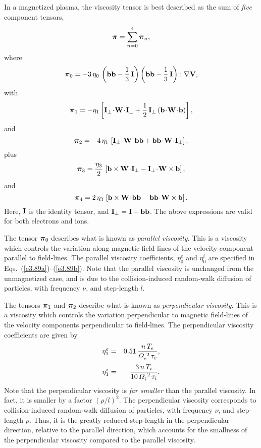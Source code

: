 In a magnetized plasma, the viscosity tensor is best described as the
sum of {\em five}\/ component tensors,
\begin{equation}
\mbox{\boldmath$\pi$}  = \sum_{n=0}^4 \mbox{\boldmath$\pi$}_n,
\end{equation}
where 
\begin{equation}
\mbox{\boldmath$\pi$}_0 = - 3\,\eta_0\,\left({\bf b}{\bf b} - \frac{1}{3}\,{\bf I}\right)
\left({\bf b}{\bf b} - \frac{1}{3}\,{\bf I}\right): \nabla {\bf V},
\end{equation}
with
\begin{equation}
\bpi_1 =- \eta_1\left[{\bf I}_\perp\! \cdot\!{\bf W}\!\cdot\!{\bf I}_\perp
+ \frac{1}{2}\,{\bf I}_\perp\,({\bf b}\!\cdot\!{\bf W}\!\cdot\!{\bf b})\right],
\end{equation}
and
\begin{equation}
\bpi_2 = -4\,\eta_1\,\left[ {\bf I}_\perp\!\cdot\!
{\bf W}\!\cdot\!{\bf b}{\bf b}
+ {\bf b}{\bf b}\!\cdot\!{\bf W} \!\cdot\!{\bf I}_\perp\right].
\end{equation}
plus
\begin{equation}
\mbox{\boldmath$\pi$}_3 = \frac{\eta_3}{2}\,\left[ {\bf b}\times 
{\bf W}\!\cdot\!{\bf I}_\perp - {\bf I}_\perp\!\cdot\!{\bf W}\times{\bf b}
\right],
\end{equation}
and
\begin{equation}
\mbox{\boldmath$\pi$}_4 = 2\,\eta_3\,\left[{\bf b} \times{\bf W} \!\cdot\! {\bf b}{\bf b}
- {\bf b}{\bf b} \!\cdot\!{\bf W} \times{\bf b}\right].
\end{equation}
Here, ${\bf I}$ is the identity tensor, and 
${\bf I}_\perp = {\bf I} - {\bf b}{\bf b}$. The above
expressions are valid for both electrons and ions. 

The tensor $\mbox{\boldmath$\pi$}_0$ describes what is known as {\em parallel viscosity}.
This is a viscosity which controls the variation along magnetic field-lines of the
velocity component parallel to  field-lines.
 The parallel
viscosity coefficients, $\eta_0^e$ and $\eta_0^i$ are specified in Eqs.~(\ref{e3.89a})--(\ref{e3.89b}). 
Note that the parallel viscosity is unchanged from the unmagnetized case,
and is due to the collision-induced random-walk diffusion of particles,
with frequency $\nu$, and step-length $l$. 

The tensors $\mbox{\boldmath$\pi$}_1$ and $\mbox{\boldmath$\pi$}_2$ describe what is known
as {\em perpendicular viscosity}. This is a viscosity
which controls the variation perpendicular to magnetic field-lines
of the velocity components perpendicular to field-lines. The perpendicular
viscosity coefficients are given by
\begin{eqnarray}
\eta_1^e &=& 0.51\, \frac{n\,T_e}{{\mit\Omega}_e^{~2}\,\tau_e},\\[0.5ex]
\eta_1^i &=& \frac{3\, n\,T_i}{10\,{\mit\Omega}_i^{~2}\,\tau_i}.
\end{eqnarray}
Note that the perpendicular viscosity is {\em far smaller}\/ than the parallel
viscosity. In fact, it is smaller by a factor $(\rho/l)^2$. The
perpendicular viscosity corresponds to collision-induced random-walk diffusion
of particles, with frequency $\nu$, and step-length $\rho$. Thus, it
is the greatly reduced step-length in the perpendicular direction, relative
to the parallel direction, which accounts for the smallness of the
perpendicular viscosity compared to the parallel viscosity. 

